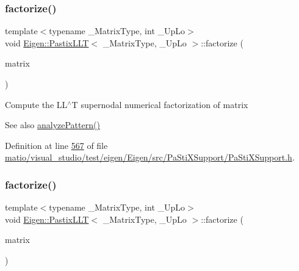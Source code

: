 \mbox{\label{class_eigen_1_1_pastix_l_l_t_a63dac317804b18a4704a519d7bdfaaff}} 
\subsubsection{\texorpdfstring{factorize()}{factorize()}\hspace{0.1cm}{\footnotesize\ttfamily [1/2]}}
{\footnotesize\ttfamily template$<$typename \+\_\+\+Matrix\+Type, int \+\_\+\+Up\+Lo$>$ \\
void \hyperlink{class_eigen_1_1_pastix_l_l_t}{Eigen\+::\+Pastix\+L\+LT}$<$ \+\_\+\+Matrix\+Type, \+\_\+\+Up\+Lo $>$\+::factorize (\begin{DoxyParamCaption}\item[{const Matrix\+Type \&}]{matrix }\end{DoxyParamCaption})\hspace{0.3cm}{\ttfamily [inline]}}

Compute the L\+L$^\wedge$T supernodal numerical factorization of {\ttfamily matrix} \begin{DoxySeeAlso}{See also}
\hyperlink{class_eigen_1_1_pastix_l_l_t_a671e8444ae2f04db3565e35caa958667}{analyze\+Pattern()} 
\end{DoxySeeAlso}


Definition at line \hyperlink{matio_2visual__studio_2test_2eigen_2_eigen_2src_2_pa_sti_x_support_2_pa_sti_x_support_8h_source_l00567}{567} of file \hyperlink{matio_2visual__studio_2test_2eigen_2_eigen_2src_2_pa_sti_x_support_2_pa_sti_x_support_8h_source}{matio/visual\+\_\+studio/test/eigen/\+Eigen/src/\+Pa\+Sti\+X\+Support/\+Pa\+Sti\+X\+Support.\+h}.

\mbox{\label{class_eigen_1_1_pastix_l_l_t_a63dac317804b18a4704a519d7bdfaaff}} 
\subsubsection{\texorpdfstring{factorize()}{factorize()}\hspace{0.1cm}{\footnotesize\ttfamily [2/2]}}
{\footnotesize\ttfamily template$<$typename \+\_\+\+Matrix\+Type, int \+\_\+\+Up\+Lo$>$ \\
void \hyperlink{class_eigen_1_1_pastix_l_l_t}{Eigen\+::\+Pastix\+L\+LT}$<$ \+\_\+\+Matrix\+Type, \+\_\+\+Up\+Lo $>$\+::factorize (\begin{DoxyParamCaption}\item[{const Matrix\+Type \&}]{matrix }\end{DoxyParamCaption})\hspace{0.3cm}{\ttfamily [inline]}}

